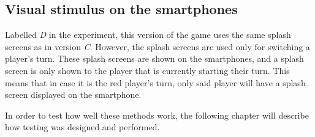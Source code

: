\subsection{Visual stimulus on the smartphones}\label{sub:visual_smartphone}
Labelled \textit{D} in the experiment, this version of the game uses the same splash screens as in version \textit{C}. However, the splash screens are used only for switching a player's turn. These splash screens are shown on the smartphones, and a splash screen is only shown to the player that is currently starting their turn. This means that in case it is the red player's turn, only said player will have a splash screen displayed on the smartphone.

In order to test how well these methods work, the following chapter will describe how testing was designed and performed.